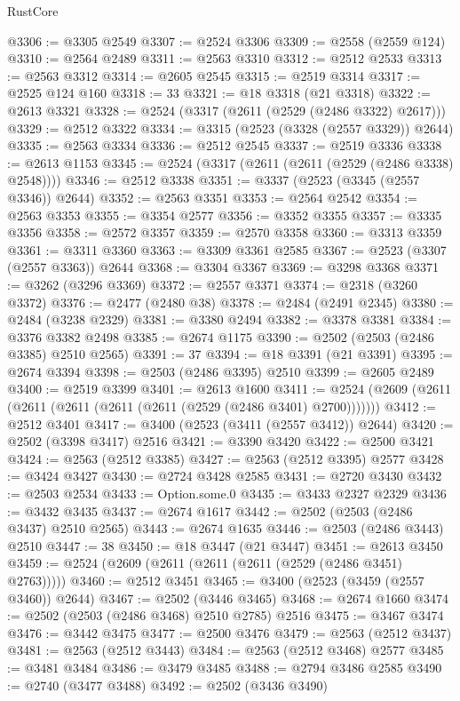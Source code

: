 \begin{lexlean}{RustCore}
\begin{coremodule}
@3306 := @3305 @2549
@3307 := @2524 @3306
@3309 := @2558 (@2559 @124)
@3310 := @2564 @2489
@3311 := @2563 @3310
@3312 := @2512 @2533
@3313 := @2563 @3312
@3314 := @2605 @2545
@3315 := @2519 @3314
@3317 := @2525 @124 @160
@3318 := 33
@3321 := @18 @3318 (@21 @3318)
@3322 := @2613 @3321
@3328 := @2524 (@3317 (@2611 (@2529 (@2486 @3322) @2617)))
@3329 := @2512 @3322
@3334 := @3315 (@2523 (@3328 (@2557 @3329)) @2644)
@3335 := @2563 @3334
@3336 := @2512 @2545
@3337 := @2519 @3336
@3338 := @2613 @1153
@3345 := @2524 (@3317 (@2611 (@2611 (@2529 (@2486 @3338) @2548))))
@3346 := @2512 @3338
@3351 := @3337 (@2523 (@3345 (@2557 @3346)) @2644)
@3352 := @2563 @3351
@3353 := @2564 @2542
@3354 := @2563 @3353
@3355 := @3354 @2577
@3356 := @3352 @3355
@3357 := @3335 @3356
@3358 := @2572 @3357
@3359 := @2570 @3358
@3360 := @3313 @3359
@3361 := @3311 @3360
@3363 := @3309 @3361 @2585
@3367 := @2523 (@3307 (@2557 @3363)) @2644
@3368 := @3304 @3367
@3369 := @3298 @3368
@3371 := @3262 (@3296 @3369)
@3372 := @2557 @3371
@3374 := @2318 (@3260 @3372)
@3376 := @2477 (@2480 @38)
@3378 := @2484 (@2491 @2345)
@3380 := @2484 (@3238 @2329)
@3381 := @3380 @2494
@3382 := @3378 @3381
@3384 := @3376 @3382 @2498
@3385 := @2674 @1175
@3390 := @2502 (@2503 (@2486 @3385) @2510 @2565)
@3391 := 37
@3394 := @18 @3391 (@21 @3391)
@3395 := @2674 @3394
@3398 := @2503 (@2486 @3395) @2510
@3399 := @2605 @2489
@3400 := @2519 @3399
@3401 := @2613 @1600
@3411 := @2524 (@2609 (@2611 (@2611 (@2611 (@2611 (@2611 (@2529 (@2486 @3401) @2700)))))))
@3412 := @2512 @3401
@3417 := @3400 (@2523 (@3411 (@2557 @3412)) @2644)
@3420 := @2502 (@3398 @3417) @2516
@3421 := @3390 @3420
@3422 := @2500 @3421
@3424 := @2563 (@2512 @3385)
@3427 := @2563 (@2512 @3395) @2577
@3428 := @3424 @3427
@3430 := @2724 @3428 @2585
@3431 := @2720 @3430
@3432 := @2503 @2534
@3433 := Option.some.{0}
@3435 := @3433 @2327 @2329
@3436 := @3432 @3435
@3437 := @2674 @1617
@3442 := @2502 (@2503 (@2486 @3437) @2510 @2565)
@3443 := @2674 @1635
@3446 := @2503 (@2486 @3443) @2510
@3447 := 38
@3450 := @18 @3447 (@21 @3447)
@3451 := @2613 @3450
@3459 := @2524 (@2609 (@2611 (@2611 (@2611 (@2529 (@2486 @3451) @2763)))))
@3460 := @2512 @3451
@3465 := @3400 (@2523 (@3459 (@2557 @3460)) @2644)
@3467 := @2502 (@3446 @3465)
@3468 := @2674 @1660
@3474 := @2502 (@2503 (@2486 @3468) @2510 @2785) @2516
@3475 := @3467 @3474
@3476 := @3442 @3475
@3477 := @2500 @3476
@3479 := @2563 (@2512 @3437)
@3481 := @2563 (@2512 @3443)
@3484 := @2563 (@2512 @3468) @2577
@3485 := @3481 @3484
@3486 := @3479 @3485
@3488 := @2794 @3486 @2585
@3490 := @2740 (@3477 @3488)
@3492 := @2502 (@3436 @3490)

\end{coremodule}
\end{lexlean}
